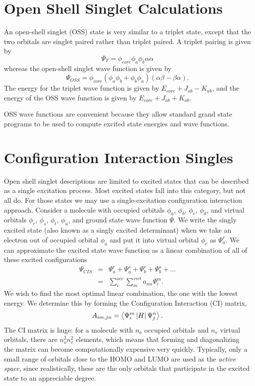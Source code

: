 \section{Open Shell Singlet Calculations}
An open-shell singlet (OSS) state is very similar to a triplet state,
except that the two orbitals are singlet paired rather than triplet
paired. A triplet pairing is given by
\begin{equation}
 \Psi_{T} = \phi_{core}\phi_a\phi_b\alpha\alpha
\end{equation}
whereas the open-shell singlet wave function is given by
\begin{equation}
 \Psi_{OSS} = \phi_{core}(\phi_a\phi_b+\phi_b\phi_a)
  (\alpha\beta-\beta\alpha).
\end{equation}
The energy for the triplet wave function is given by $E_{core} +
J_{ab} - K_{ab}$, and the energy of the OSS wave function is given by
$E_{core} + J_{ab} + K_{ab}$.  

OSS wave functions are convenient because they allow standard grand
state programs to be used to compute excited state energies and wave
functions. 

\section{Configuration Interaction Singles}
Open shell singlet descriptions are limited to excited states that can
be described as a single excitation process. Most excited states fall
into this category, but not all do. For those states we may use a
single-excitation configuration interaction approach. Consider a
molecule with occupied orbitals $\phi_a$, $\phi_b$, $\phi_c$,
$\phi_d$, and virtual orbitals $\phi_r$, $\phi_s$, $\phi_t$,
$\phi_u$, and ground state wave function $\Psi$. We write the singly
excited state (also known as a singly excited determinant) when we
take an electron out of occupied orbital $\phi_a$ and put it into
virtual orbital $\phi_r$ as $\Psi_a^r$. We can approximate the excited
state wave function as a linear combination of all of these excited
configurations
\begin{eqnarray}
 \Psi_{CIS} &=& \Psi_a^r + \Psi_a^s + \Psi_b^r + \Psi_b^s + \dots \\
            &=& \sum_i^{occ}\sum_m^{virt} a_{im}\Psi_i^m.
\end{eqnarray}
We wish to find the most optimal linear combination, the one with the
lowest energy. We determine this by forming the Configuration
Interaction (CI) matrix, 
\begin{eqnarray}
 A_{im,jn} = \left\langle{\Psi_i^m}\left|{H}\right|{\Psi_j^n}\right\rangle.
\end{eqnarray}
The CI matrix is huge: for a molecule with $n_o$ occupied orbitals and
$n_v$ virtual orbitals, there are $n_o^2n_v^2$ elements, which means
that forming and diagonalizing the matrix can become computationally
expensive very quickly. Typically, only a small range of orbitals
close to the HOMO and LUMO are used as the \emph{active space}, since
realistically, these are the only orbitals that participate in the
excited state to an appreciable degree.

